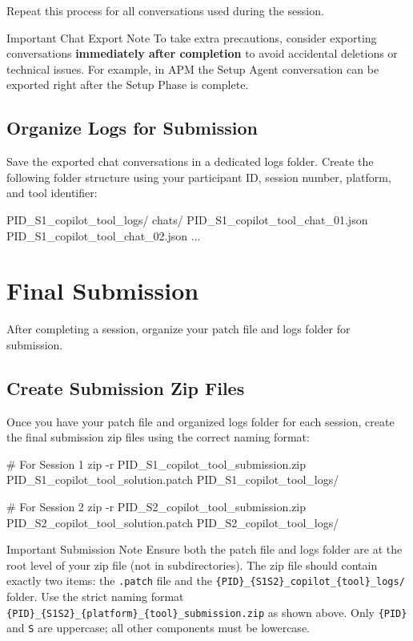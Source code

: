 \documentclass[11pt, a4paper]{article}
\begin{document}
\noindent Repeat this process for all conversations used during the session.
\begin{mainbox}{Important Chat Export Note}
To take extra precautions, consider exporting conversations \textbf{immediately after completion} to avoid accidental deletions or technical issues. For example, in APM the Setup Agent conversation can be exported right after the Setup Phase is complete.
\end{mainbox}

\subsection{Organize Logs for Submission}

Save the exported chat conversations in a dedicated logs folder. Create the following folder structure using your participant ID, session number, platform, and tool identifier:

\begin{codebox}
{PID}_S1_copilot_{tool}_logs/
    chats/
        {PID}_S1_copilot_{tool}_chat_01.json
        {PID}_S1_copilot_{tool}_chat_02.json
        ...
\end{codebox}

\section{Final Submission}

After completing a session, organize your patch file and logs folder for submission.

\subsection{Create Submission Zip Files}

Once you have your patch file and organized logs folder for each session, create the final submission zip files using the correct naming format:
\begin{codebox}
# For Session 1
zip -r {PID}_S1_copilot_{tool}_submission.zip {PID}_S1_copilot_{tool}_solution.patch {PID}_S1_copilot_{tool}_logs/

# For Session 2
zip -r {PID}_S2_copilot_{tool}_submission.zip {PID}_S2_copilot_{tool}_solution.patch {PID}_S2_copilot_{tool}_logs/
\end{codebox}

\begin{mainbox}{Important Submission Note}
Ensure both the patch file and logs folder are at the root level of your zip file (not in subdirectories). The zip file should contain exactly two items: the \texttt{.patch} file and the \texttt{\{PID\}\_\{S1\textbar{}S2\}\_copilot\_\{tool\}\_logs/} folder. Use the strict naming format \texttt{\{PID\}\_\{S1\textbar{}S2\}\_\{platform\}\_\{tool\}\_submission.zip} as shown above. Only \texttt{\{PID\}} and \texttt{S} are uppercase; all other components must be lowercase.
\end{mainbox}
\end{document}

